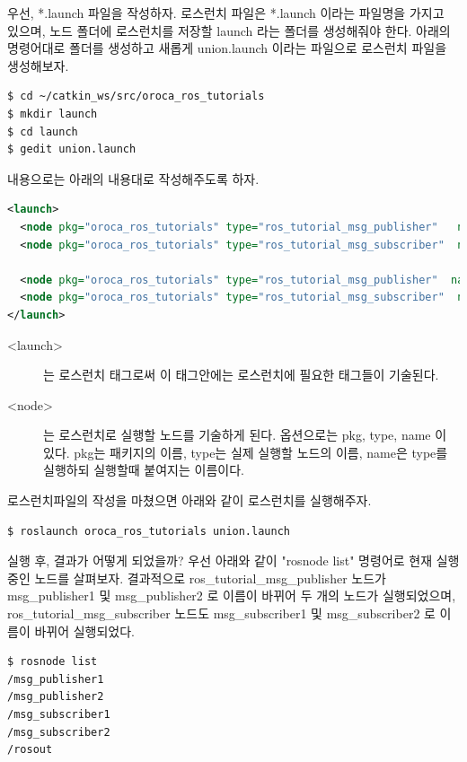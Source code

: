 우선, *.launch 파일을 작성하자. 로스런치 파일은 *.launch 이라는 파일명을 가지고 있으며, 노드 폴더에 로스런치를 저장할 launch 라는 폴더를 생성해줘야 한다. 아래의 명령어대로 폴더를 생성하고 새롭게 union.launch 이라는 파일으로 로스런치 파일을 생성해보자.

\begin{lstlisting}[language=ROS]
$ cd ~/catkin_ws/src/oroca_ros_tutorials
$ mkdir launch
$ cd launch
$ gedit union.launch
\end{lstlisting}

내용으로는 아래의 내용대로 작성해주도록 하자.

\begin{lstlisting}[language=XML]
<launch>
  <node pkg="oroca_ros_tutorials" type="ros_tutorial_msg_publisher"   name="msg_publisher1"/>
  <node pkg="oroca_ros_tutorials" type="ros_tutorial_msg_subscriber"  name="msg_subscriber1"/>

  <node pkg="oroca_ros_tutorials" type="ros_tutorial_msg_publisher"  name="msg_publisher2"/>
  <node pkg="oroca_ros_tutorials" type="ros_tutorial_msg_subscriber"  name="msg_subscriber2"/>
</launch>
\end{lstlisting}

\begin{description}
\item[\textless launch\textgreater] 는 로스런치 태그로써 이 태그안에는 로스런치에 필요한 태그들이 기술된다.
\item[\textless node\textgreater] 는 로스런치로 실행할 노드를 기술하게 된다. 옵션으로는 pkg, type, name 이 있다. pkg는 패키지의 이름, type는 실제 실행할 노드의 이름, name은 type를 실행하되 실행할때 붙여지는 이름이다.  
\end{description}

로스런치파일의 작성을 마쳤으면 아래와 같이 로스런치를 실행해주자.

\begin{lstlisting}[language=ROS]
$ roslaunch oroca_ros_tutorials union.launch
\end{lstlisting}

실행 후, 결과가 어떻게 되었을까? 우선 아래와 같이 "rosnode list" 명령어로 현재 실행중인 노드를 살펴보자. 결과적으로  ros\_tutorial\_msg\_publisher 노드가 msg\_publisher1 및 msg\_publisher2 로 이름이 바뀌어 두 개의 노드가 실행되었으며, ros\_tutorial\_msg\_subscriber 노드도  msg\_subscriber1 및 msg\_subscriber2 로 이름이 바뀌어 실행되었다.  

\begin{lstlisting}[language=ROS]
$ rosnode list
/msg_publisher1
/msg_publisher2
/msg_subscriber1
/msg_subscriber2
/rosout
\end{lstlisting}

